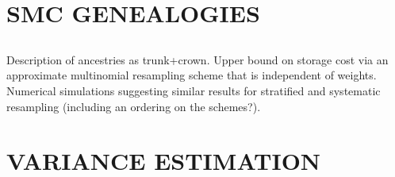 \documentclass{article}
\begin{document}
%
\section*{SMC GENEALOGIES}

\subsection*{\cite{jacob2015}}
Description of ancestries as trunk+crown. Upper bound on storage cost via an approximate multinomial resampling scheme that is independent of weights. Numerical simulations suggesting similar results for stratified and systematic resampling (including an ordering on the schemes?). 

\subsection*{\cite{koskela2018}}


%
\section*{VARIANCE ESTIMATION}

\subsection*{\cite{chan2013}}


\subsection*{\cite{lee2018}}


\subsection*{\cite{olsson2019}}


%
\end{document}
